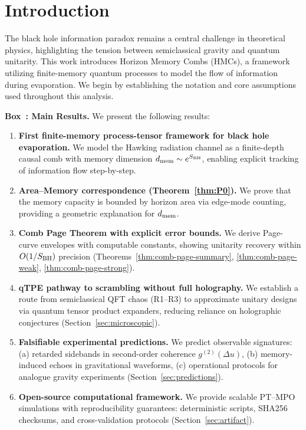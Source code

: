 \documentclass[aps,prd,preprint,onecolumn,superscriptaddress,nofootinbib,longbibliography,floatfix,11pt,showpacs,showkeys]{revtex4-2}
\newcounter{boxedresult}
\newenvironment{boxedresult}[1]{\refstepcounter{boxedresult}\begin{infobox}\noindent\textbf{Box~\theboxedresult: #1.}}{\end{infobox}}
\theoremstyle{plain}
\theoremstyle{definition}
\theoremstyle{remark}
\begin{document}
\newcommand{\condtag}{\textsuperscript{(C1--C3)}}


\section{Introduction}
\label{sec:intro}

The black hole information paradox remains a central challenge in theoretical physics, highlighting the tension between semiclassical gravity and quantum unitarity. This work introduces Horizon Memory Combs (HMCs), a framework utilizing finite-memory quantum processes to model the flow of information during evaporation. We begin by establishing the notation and core assumptions used throughout this analysis.

\begin{boxedresult}{Main Results}
\small
We present the following results:
\begin{enumerate}[leftmargin=1.5em,itemsep=0.2em,topsep=0.3em]
\item \textbf{First finite-memory process-tensor framework for black hole evaporation.} We model the Hawking radiation channel as a finite-depth causal comb with memory dimension $d_{\rm mem} \sim e^{S_{\rm BH}}$, enabling explicit tracking of information flow step-by-step.
\item \textbf{Area--Memory correspondence (Theorem~\ref{thm:P0}).} We prove that the memory capacity is bounded by horizon area via edge-mode counting, providing a geometric explanation for $d_{\rm mem}$.
\item \textbf{Comb Page Theorem with explicit error bounds.} We derive Page-curve envelopes with computable constants, showing unitarity recovery within $O(1/S_{\rm BH})$ precision (Theorems~\ref{thm:comb-page-summary}, \ref{thm:comb-page-weak}, \ref{thm:comb-page-strong}).
\item \textbf{qTPE pathway to scrambling without full holography.} We establish a route from semiclassical QFT chaos (R1--R3) to approximate unitary designs via quantum tensor product expanders, reducing reliance on holographic conjectures (Section~\ref{sec:microscopic}).
\item \textbf{Falsifiable experimental predictions.} We predict observable signatures: (a) retarded sidebands in second-order coherence $g^{(2)}(\Delta u)$, (b) memory-induced echoes in gravitational waveforms, (c) operational protocols for analogue gravity experiments (Section~\ref{sec:predictions}).
\item \textbf{Open-source computational framework.} We provide scalable PT--MPO simulations with reproducibility guarantees: deterministic scripts, SHA256 checksums, and cross-validation protocols (Section~\ref{sec:artifact}).
\end{enumerate}
\end{boxedresult}
\end{document}
